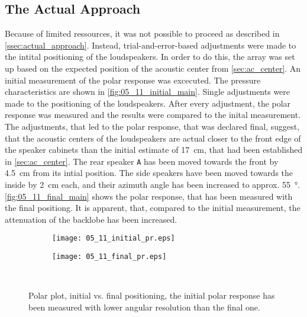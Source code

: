 \subsection{The Actual Approach}\label{ssec:actual_approach}
Because of limited ressources, it was not possible to proceed as described in \autoref{ssec:actual_approach}. Instead, trial-and-error-based adjustments were made to the intital positioning of the loudspeakers. In order to do this, the array was set up based on the  expected position of the acoustic center from \autoref{sec:ac_center}. An initial measurement of the polar response was excecuted. The pressure characteristics are shown in \autoref{fig:05_11_initial_main}. Single adjustments were made to the positioning of the loudspeakers. After every adjustment, the polar response was measured and the results were compared to the inital measurement. The adjustments, that led to the polar response, that was declared final, suggest, that the acoustic centers of the loudspeakers are actual closer to the front edge of the speaker cabinets than the initial estimate of \SI{17}{\centi\meter}, that had been established in \autoref{sec:ac_center}. The rear speaker \texttt{A} has been moved towards the front by \SI{4.5}{\centi\meter} from its intial position. The side speakers have been moved towards the inside by \SI{2}{\centi\meter} each, and their azimuth angle has been increased to approx. \SI{55}{\degree}. \autoref{fig:05_11_final_main} shows the polar response, that has been measured with the final positiong. It is apparent, that, compared to the initial measurement, the attenuation of the backlobe has been increased.

\begin{figure}[H]
\begin{subfigure}[c]{0.5\textwidth}
\texttt{[image: 05\_11\_initial\_pr.eps]}
\label{fig:05_11_initial_main}
\end{subfigure}
\begin{subfigure}[c]{0.5\textwidth}
\texttt{[image: 05\_11\_final\_pr.eps]}
\label{fig:05_11_final_main}
\end{subfigure}\\
\caption{Polar plot, initial vs. final positioning, the initial polar response has been measured with lower angular resolution than the final one.}  
\label{fig:05_11_adjustments}
\end{figure}